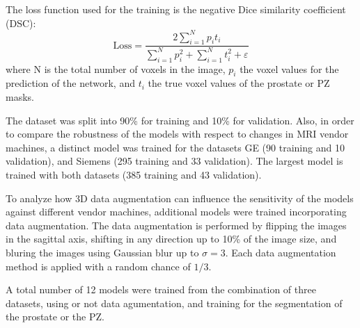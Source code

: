 The loss function used for the training is the negative Dice similarity coefficient (DSC):
\begin{equation}
\text{Loss} = \frac{2 \sum_{i=1}^{N}p_it_i}{\sum_{i=1}^{N}p_i^2 + \sum_{i=1}^{N}t_i^2 + \varepsilon} 
\label{eq:dsc}
\end{equation}
where N is the total number of voxels in the image, $p_i$ the voxel values for the 
prediction of the network, and $t_i$ the true voxel values of the prostate or PZ masks.

The dataset was split into 90\% for training and 10\% for
validation. Also, in order to compare the robustness of the models with respect to changes
in MRI vendor machines,  a distinct model was trained for the datasets GE (90
training and 10 validation), and Siemens (295 training and 33 validation).
The largest model is trained with both datasets (385 training and 43 validation). 

To analyze how 3D data augmentation can influence the sensitivity of the models
against different vendor machines, additional models were trained 
incorporating data augmentation. The data augmentation is performed by flipping the
images in the sagittal axis,  shifting in any direction up to 10\% of the image size, and
bluring the images using Gaussian blur up to $\sigma = 3$. Each data augmentation
method is applied with a random chance of $1/3$.

A total number of 12 models were trained from the combination of 
three datasets, using or not data agumentation, and training for the segmentation 
of the prostate or the PZ. 
